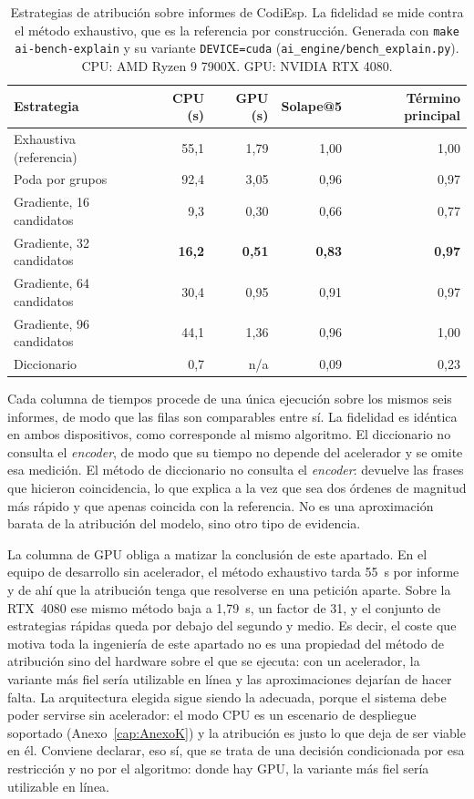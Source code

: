 \begin{table}[h]
\centering
\small
\caption{Estrategias de atribución sobre informes de CodiEsp. La fidelidad se mide contra el método exhaustivo, que es la referencia por construcción. Generada con \texttt{make ai-bench-explain} y su variante \texttt{DEVICE=cuda} (\texttt{ai\_engine/bench\_explain.py}). CPU: AMD Ryzen 9 7900X. GPU: NVIDIA RTX 4080.}
\label{tab:explicabilidad}
\begin{tabular}{lrrrr}
\hline
\textbf{Estrategia} & \textbf{CPU (s)} & \textbf{GPU (s)} & \textbf{Solape@5} & \textbf{Término principal} \\
\hline
Exhaustiva (referencia) & 55{,}1 & 1{,}79 & 1{,}00 & 1{,}00 \\
Poda por grupos & 92{,}4 & 3{,}05 & 0{,}96 & 0{,}97 \\
\hline
Gradiente, 16 candidatos & 9{,}3 & 0{,}30 & 0{,}66 & 0{,}77 \\
Gradiente, 32 candidatos & \textbf{16{,}2} & \textbf{0{,}51} & \textbf{0{,}83} & \textbf{0{,}97} \\
Gradiente, 64 candidatos & 30{,}4 & 0{,}95 & 0{,}91 & 0{,}97 \\
Gradiente, 96 candidatos & 44{,}1 & 1{,}36 & 0{,}96 & 1{,}00 \\
\hline
Diccionario & 0{,}7 & n/a & 0{,}09 & 0{,}23 \\
\hline
\end{tabular}

\vspace{2mm}
{\footnotesize Cada columna de tiempos procede de una única ejecución sobre los mismos seis informes, de modo que las filas son comparables entre sí. La fidelidad es idéntica en ambos dispositivos, como corresponde al mismo algoritmo. El diccionario no consulta el \emph{encoder}, de modo que su tiempo no depende del acelerador y se omite esa medición. El método de diccionario no consulta el \emph{encoder}: devuelve las frases que hicieron coincidencia, lo que explica a la vez que sea dos órdenes de magnitud más rápido y que apenas coincida con la referencia. No es una aproximación barata de la atribución del modelo, sino otro tipo de evidencia.}
\end{table}

La columna de GPU obliga a matizar la conclusión de este apartado. En el equipo de desarrollo sin acelerador, el método exhaustivo tarda 55~s por informe y de ahí que la atribución tenga que resolverse en una petición aparte. Sobre la RTX~4080 ese mismo método baja a 1,79~s, un factor de 31, y el conjunto de estrategias rápidas queda por debajo del segundo y medio. Es decir, el coste que motiva toda la ingeniería de este apartado no es una propiedad del método de atribución sino del hardware sobre el que se ejecuta: con un acelerador, la variante más fiel sería utilizable en línea y las aproximaciones dejarían de hacer falta. La arquitectura elegida sigue siendo la adecuada, porque el sistema debe poder servirse sin acelerador: el modo CPU es un escenario de despliegue soportado (Anexo~\ref{cap:AnexoK}) y la atribución es justo lo que deja de ser viable en él. Conviene declarar, eso sí, que se trata de una decisión condicionada por esa restricción y no por el algoritmo: donde hay GPU, la variante más fiel sería utilizable en línea.


